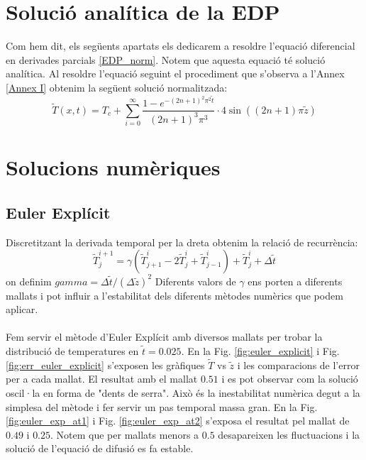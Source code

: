 \documentclass{article}
\begin{document}
\section{Solució analítica de la EDP}
Com hem dit, els següents apartats els dedicarem a resoldre l'equació diferencial en derivades parcials \eqref{EDP_norm}. Notem que aquesta equació té solució analítica. Al resoldre l'equació seguint el procediment que s'observa a l'Annex \ref{Annex I} obtenim la següent solució normalitzada:
\begin{equation*}
    \tilde{T}(x,t) = T_c + \sum_{i=0}^{\infty} \frac{ 1-e^{-(2n+1)^2 \pi^2 \tilde{t}}}{(2n+1)^3\pi^3}\cdot 4\sin((2n+1)\pi \tilde{z})
\end{equation*}

\section{Solucions numèriques}
\subsection{Euler Explícit}
Discretitzant la derivada temporal per la dreta obtenim la relació de recurrència:
\begin{equation*}
    \tilde{T}_{j}^{i+1} = \gamma (\tilde{T}_{j+1}^{i}-2\tilde{T}_{j}^{i}+\tilde{T}_{j-1}^{i}) + \tilde{T}_{j}^{i} + \Delta \tilde{t}
\end{equation*}
on definim $gamma = \Delta \tilde{t}/(\Delta \tilde{z})^2$ Diferents valors de $\gamma$ ens porten a diferents mallats i pot influir a l'estabilitat dels diferents mètodes numèrics que podem aplicar.\\\\
Fem servir el mètode d'Euler Explícit \cite{Navau2024} amb diversos mallats per trobar la distribució de temperatures en $\tilde{t}=0.025$. En la Fig. \ref{fig:euler_explicit} i Fig. \ref{fig:err_euler_explicit} s'exposen les gràfiques $\tilde{T}$ vs $\tilde{z}$ i les comparacions de l'error per a cada mallat. El resultat amb el mallat $0.51$ i es pot observar com la solució oscil·la en forma de "dents de serra". Això és la inestabilitat numèrica degut a la simplesa del mètode i fer servir un pas temporal massa gran.  En la Fig. \ref{fig:euler_exp_at1} i Fig. \ref{fig:euler_exp_at2} s'exposa el resultat pel mallat de $0.49$ i $0.25$. Notem que per mallats menors a $0.5$ desapareixen les fluctuacions i la solució de l'equació de difusió es fa estable.
\end{document}
